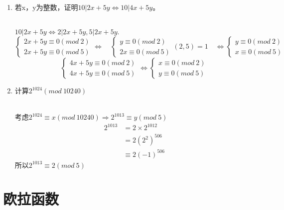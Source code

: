 \documentclass[cn,10pt]{elegantbook}
\begin{document}
\begin{exercise}
  \begin{enumerate}
    \item 若x，y为整数，证明$10|2x+5y \Leftrightarrow 10 | 4x+5y$。
    \begin{solution}
      \\
      $10|2x+5y \Leftrightarrow 2|2x+5y, 5|2x+5y.$
     \[
       \begin{cases}
         2x+5y \equiv 0(mod \ 2)\\
         2x+5y \equiv 0(mod \ 5)
       \end{cases}
       \Leftrightarrow \quad 
       \begin{cases}
         y \equiv 0(mod \ 2)\\
         2x \equiv 0(mod \ 5)
       \end{cases}
       (2,5)=1 \quad \Leftrightarrow
       \begin{cases}
        y \equiv 0(mod \ 2)\\
        x \equiv 0(mod \ 5)
       \end{cases}
      \]
      \[
       \begin{cases}
         4x +5y \equiv 0(mod \ 2)\\
         4x+5y \equiv 0(mod \ 5)
       \end{cases}
       \Leftrightarrow
       \begin{cases}
         x \equiv 0(mod \ 2)\\
         y \equiv 0(mod \ 5)
       \end{cases}
     \]
    \end{solution}
    \item 计算$2^{1024}( mod \ 10240 )$
    \begin{solution}
      \\考虑$2^{1024} \equiv x(mod \ 10240) \Rightarrow 2^{1013} \equiv y(mod \ 5)$
      \begin{align*}
        2^{1013}&=2 \times 2^{1012}\\
        &=2(2^2)^{506}\\
        &\equiv 2(-1)^{506}
      \end{align*}
      所以$2^{1013}\equiv 2 (mod \ 5)$
    \end{solution}
  \end{enumerate}
\end{exercise}
\section{欧拉函数}
\end{document}
